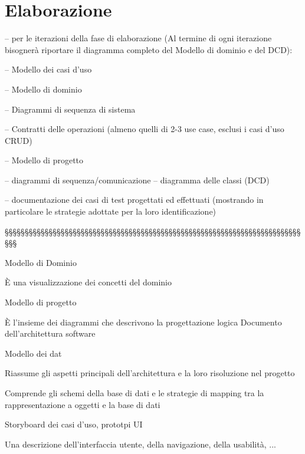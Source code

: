 \section{Elaborazione}
	
	
– per le iterazioni della fase di elaborazione (Al termine di ogni iterazione bisognerà riportare il diagramma completo del Modello di dominio e del DCD):

 – Modello dei casi d'uso
 
  – Modello di dominio
  
   – Diagrammi di sequenza di sistema 
   
   – Contratti delle operazioni (almeno quelli di 2-3 use case, esclusi i casi d’uso CRUD)
 
– Modello di progetto 

– diagrammi di sequenza/comunicazione – diagramma delle classi (DCD)

– documentazione dei casi di test progettati ed effettuati (mostrando in particolare le strategie adottate per la loro identificazione)

§§§§§§§§§§§§§§§§§§§§§§§§§§§§§§§§§§§§§§§§§§§§§§§§§§§§§§§§§§§§§§§§§§§§§§§§§§§§§

Modello di Dominio 

È una visualizzazione dei concetti del dominio

Modello di progetto 

È l'insieme dei diagrammi che descrivono la progettazione logica
Documento dell'architettura software 

Modello dei dat 

Riassume gli aspetti principali dell'architettura e la loro risoluzione nel progetto

Comprende gli schemi della base di dati e le strategie di mapping tra la rappresentazione a oggetti e la base di dati

Storyboard dei casi d'uso, prototpi UI 

Una descrizione dell'interfaccia utente, della navigazione, della usabilità, ...


